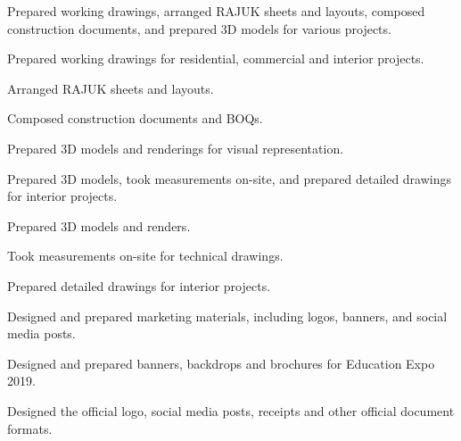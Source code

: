 \betweenProjectsVSpace
{}
\betweenSummaryPointsVSpace
Prepared working drawings, arranged RAJUK sheets and layouts, composed construction documents, and prepared 3D models for various projects.

\begin{tightemize}
\item Prepared working drawings for residential, commercial and interior projects.
\item Arranged RAJUK sheets and layouts.
\item Composed construction documents and BOQs.
\item Prepared 3D models and renderings for visual representation.
\end{tightemize}

\betweenProjectsVSpace
{}
\betweenSummaryPointsVSpace
Prepared 3D models, took measurements on-site, and prepared detailed drawings for interior projects.

\begin{tightemize}
\item Prepared 3D models and renders.
\item Took measurements on-site for technical drawings.
\item Prepared detailed drawings for interior projects.
\end{tightemize}

\betweenProjectsVSpace
{}
\betweenSummaryPointsVSpace
Designed and prepared marketing materials, including logos, banners, and social media posts.

\begin{tightemize}
\item Designed and prepared banners, backdrops and brochures for Education Expo 2019.
\item Designed the official logo, social media posts, receipts and other official document formats.
\end{tightemize}
